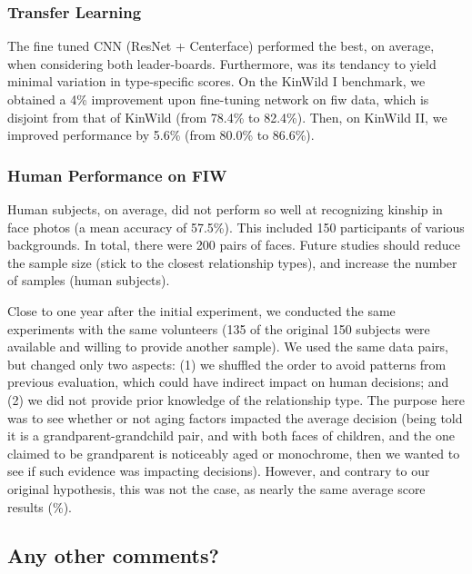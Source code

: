 \subsubsection*{Transfer Learning}
The fine tuned CNN (\ie ResNet + Centerface) performed the best, on average, when considering both leader-boards. Furthermore, was its tendancy to yield minimal variation in type-specific scores. On the KinWild I benchmark, we obtained a 4\% improvement upon fine-tuning network on \gls{fiw} data, which is disjoint from that of KinWild (\ie from 78.4\% to 82.4\%). Then, on KinWild II, we improved performance by 5.6\% (\ie from 80.0\% to 86.6\%).


\subsubsection*{Human Performance on FIW}
Human subjects, on average, did not perform so well at recognizing kinship in face photos (\ie a mean accuracy of 57.5\%). This included 150 participants of various backgrounds. In total, there were 200 pairs of faces. Future studies should reduce the sample size (\ie stick to the closest relationship types), and increase the number of samples (\ie human subjects). 

Close to one year after the initial experiment, we conducted the same experiments with the same volunteers (135 of the original 150 subjects were available and willing to provide another sample). We used the same data pairs, but changed only two aspects: (1) we shuffled the order to avoid patterns from previous evaluation, which could have indirect impact on human decisions; and (2) we did not provide prior knowledge of the relationship type. The purpose here was to see whether or not aging factors impacted the average decision (\ie being told it is a grandparent-grandchild pair, and with both faces of children, and the one claimed to be grandparent is noticeably aged or monochrome, then we wanted to see if such evidence was impacting decisions). However, and contrary to our original hypothesis, this was not the case, as nearly the same average score results (\%).




\subsection*{Any other comments?}

